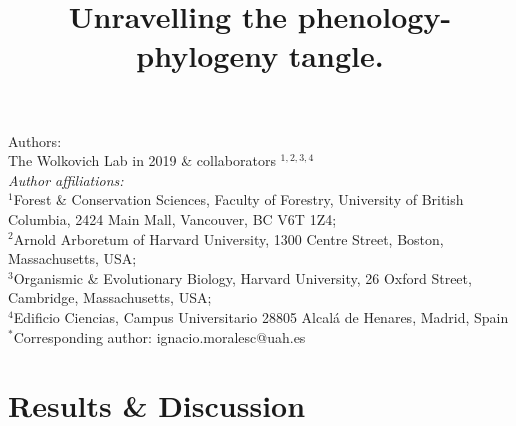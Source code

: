 \documentclass{article}\usepackage[]{graphicx}\usepackage[]{color}
\title{Unravelling the phenology-phylogeny tangle.}
\begin{document}
\maketitle

\noindent Authors:\\
The Wolkovich Lab in 2019 \& collaborators $^{1,2,3,4}$ %
\vspace{2ex}\\
\emph{Author affiliations:}\\
$^{1}$Forest \& Conservation Sciences, Faculty of Forestry, University of British Columbia, 2424 Main Mall, Vancouver, BC V6T 1Z4;\\
$^{2}$Arnold Arboretum of Harvard University, 1300 Centre Street, Boston, Massachusetts, USA;\\
$^{3}$Organismic \& Evolutionary Biology, Harvard University, 26 Oxford Street, Cambridge, Massachusetts, USA;\\
$^{4}$Edificio Ciencias, Campus Universitario 28805 Alcalá de Henares, Madrid, Spain\\
 

\vspace{2ex}
$^*$Corresponding author: ignacio.moralesc@uah.es\\
\renewcommand{\thetable}{\arabic{table}}
\renewcommand{\thefigure}{\arabic{figure}}
\renewcommand{\labelitemi}{$-$}

\clearpage







\section*{Results \& Discussion}
\end{document}
